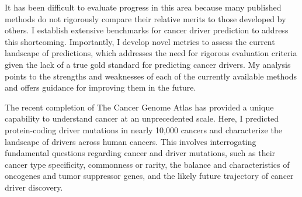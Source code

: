 It has been difficult to evaluate progress in this area because many published methods do not rigorously compare their relative merits to those developed by others. I establish extensive benchmarks for cancer driver prediction to address this shortcoming. Importantly, I develop novel metrics to assess the current landscape of predictions, which addresses the need for rigorous evaluation criteria given the lack of a true gold standard for predicting cancer drivers. My analysis points to the strengths and weaknesses of each of the currently available methods and offers guidance for improving them in the future.

The recent completion of The Cancer Genome Atlas has provided a unique capability to understand cancer at an unprecedented scale. Here, I predicted protein-coding driver mutations in nearly 10,000 cancers and characterize the landscape of drivers across human cancers. This involves interrogating fundamental questions regarding cancer and driver mutations, such as their cancer type specificity, commonness or rarity, the balance and characteristics of oncogenes and tumor suppressor genes, and the likely future trajectory of cancer driver discovery.




